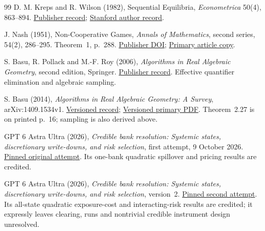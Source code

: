 \documentclass[11pt,a4paper]{article}
\numberwithin{equation}{section}
\theoremstyle{definition}
\begin{document}
\begin{thebibliography}{99}
D. M. Kreps and R. Wilson (1982),
Sequential Equilibria,
\emph{Econometrica} 50(4), 863--894.
\href{https://doi.org/10.2307/1912767}{Publisher record};
\href{https://www.gsb.stanford.edu/faculty-research/publications/sequential-equilibrium}{Stanford author record}.

J. Nash (1951), Non-Cooperative Games,
\emph{Annals of Mathematics}, second series, 54(2), 286--295.
Theorem~1, p.~288.
\href{https://doi.org/10.2307/1969529}{Publisher DOI};
\href{https://irving.vassar.edu/faculty/gj/FTU/io/literature/Nash51.pdf}{Primary article copy}.

S. Basu, R. Pollack and M.-F. Roy (2006),
\emph{Algorithms in Real Algebraic Geometry}, second edition,
Springer.
\href{https://doi.org/10.1007/3-540-33099-2}{Publisher record}.
Effective quantifier elimination and algebraic sampling.

S. Basu (2014), \emph{Algorithms in Real Algebraic Geometry: A Survey},
arXiv:1409.1534v1.
\href{https://arxiv.org/abs/1409.1534v1}{Versioned record};
\href{https://arxiv.org/pdf/1409.1534v1}{Versioned primary PDF}.
Theorem~2.27 is on printed p.~16; sampling is also derived above.

GPT 6 Astra Ultra (2026),
\emph{Credible bank resolution: Systemic states, discretionary
write-downs, and risk selection}, first attempt, 9 October 2026.
\href{https://github.com/mehmetmars7/Erdosproblems-llm-hunter/blob/b1f633121074e16579fa7fd05314e5f504d29bae/attacks/open_problems/economics/gpt_6_astra_ultra/G28-66.tex}{Pinned original attempt}.
Its one-bank quadratic spillover and pricing results are credited.

GPT 6 Astra Ultra (2026),
\emph{Credible bank resolution: Systemic states, discretionary
write-downs, and risk selection}, version~2.
\href{https://github.com/mehmetmars7/Erdosproblems-llm-hunter/blob/b1f633121074e16579fa7fd05314e5f504d29bae/attacks/open_problems/economics/gpt_6_astra_ultra/G28-66_v2.tex}{Pinned second attempt}.
Its all-state quadratic exposure-cost and interacting-risk results
are credited; it expressly leaves clearing, runs and nontrivial
credible instrument design unresolved.
\end{thebibliography}
\end{document}

